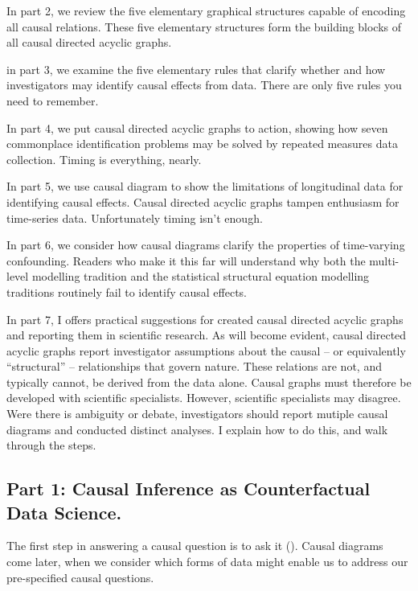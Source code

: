 \documentclass[
  single column]{article}
\begin{document}
In part 2, we review the five elementary graphical structures capable of
encoding all causal relations. These five elementary structures form the
building blocks of all causal directed acyclic graphs.

in part 3, we examine the five elementary rules that clarify whether and
how investigators may identify causal effects from data. There are only
five rules you need to remember.

In part 4, we put causal directed acyclic graphs to action, showing how
seven commonplace identification problems may be solved by repeated
measures data collection. Timing is everything, nearly.

In part 5, we use causal diagram to show the limitations of longitudinal
data for identifying causal effects. Causal directed acyclic graphs
tampen enthusiasm for time-series data. Unfortunately timing isn't
enough.

In part 6, we consider how causal diagrams clarify the properties of
time-varying confounding. Readers who make it this far will understand
why both the multi-level modelling tradition and the statistical
structural equation modelling traditions routinely fail to identify
causal effects.

In part 7, I offers practical suggestions for created causal directed
acyclic graphs and reporting them in scientific research. As will become
evident, causal directed acyclic graphs report investigator assumptions
about the causal -- or equivalently ``structural'' -- relationships that
govern nature. These relations are not, and typically cannot, be derived
from the data alone. Causal graphs must therefore be developed with
scientific specialists. However, scientific specialists may disagree.
Were there is ambiguity or debate, investigators should report mutiple
causal diagrams and conducted distinct analyses. I explain how to do
this, and walk through the steps.

\subsection{Part 1: Causal Inference as Counterfactual Data
Science.}\label{part-1-causal-inference-as-counterfactual-data-science.}

The first step in answering a causal question is to ask it
(). Causal
diagrams come later, when we consider which forms of data might enable
us to address our pre-specified causal questions.
\end{document}

